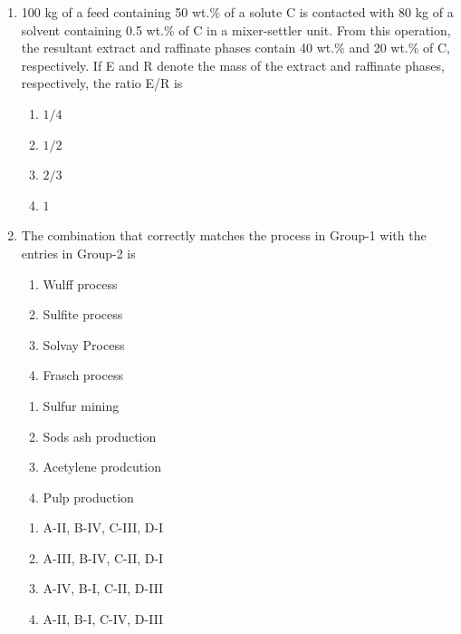 \documentclass[journal]{IEEEtran}
\begin{document}
\begin{enumerate}
    \item 100 kg of a feed containing 50 wt.\% of a solute C is contacted with 80 kg of a solvent containing 0.5 wt.\% of C in a mixer-settler unit. From this operation, the resultant extract and raffinate phases contain 40 wt.\% and 20 wt.\% of C, respectively. If E and R denote the mass of the extract and raffinate phases, respectively, the ratio E/R is 

\begin{multicols}{4}
    \begin{enumerate}
        \item $1/4$
        \item $1/2$
        \item $2/3$
        \item $1$
    \end{enumerate}
\end{multicols}

    \item The combination that correctly matches the process in Group-1 with the entries in Group-2 is

\begin{multicols}{2}
    \begin{enumerate}[label = \Alph*)]
        \item Wulff process
        \item Sulfite process
        \item Solvay Process
        \item Frasch process
    \end{enumerate}
\columnbreak
    \begin{enumerate}[label = \Roman*)]
        \item Sulfur mining
        \item Sods ash production 
        \item Acetylene prodcution
        \item Pulp production
    \end{enumerate}
\end{multicols}
\begin{multicols}{2}
    \begin{enumerate}
        \item A-II, B-IV, C-III, D-I
        \item A-III, B-IV, C-II, D-I
        \item A-IV, B-I, C-II, D-III
        \item A-II, B-I, C-IV, D-III
    \end{enumerate}
\end{multicols}


\end{enumerate}
\end{document}

